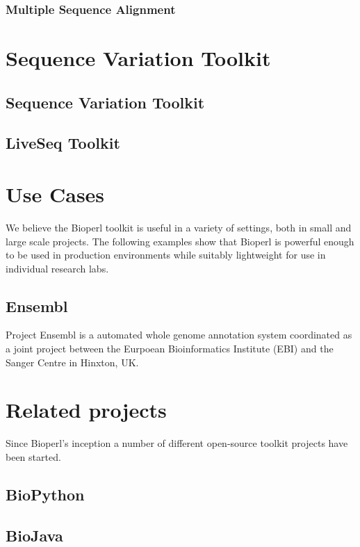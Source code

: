 \documentclass{article}
\begin{document}
\begin{twocolumn}
\subsubsection{Multiple Sequence Alignment}


\section{Sequence Variation Toolkit}

\subsection{Sequence Variation Toolkit}

\subsection{LiveSeq Toolkit} 
\section{Use Cases}

We believe the Bioperl toolkit is useful in a variety of settings,
both in small and large scale projects.  The following examples
show that Bioperl is powerful enough to be used in production
environments while suitably lightweight for use in individual research
labs.

\subsection{Ensembl}
Project Ensembl is a automated whole genome annotation system
coordinated as a joint project between the Eurpoean Bioinformatics
Institute (EBI) and the Sanger Centre in Hinxton, UK.    


\section{Related projects}

Since Bioperl's inception a number of different open-source toolkit
projects have been started.  

\subsection{BioPython}

\subsection{BioJava}


\end{twocolumn}
\end{document}
